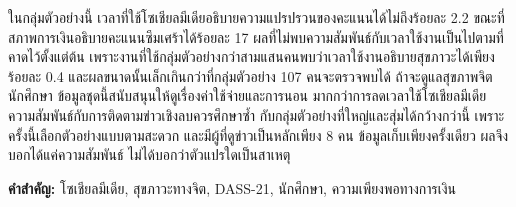 ในกลุ่มตัวอย่างนี้ เวลาที่ใช้โซเชียลมีเดียอธิบายความแปรปรวนของคะแนนได้ไม่ถึงร้อยละ 2.2
ขณะที่สภาพการเงินอธิบายคะแนนซึมเศร้าได้ร้อยละ 17
ผลที่ไม่พบความสัมพันธ์กับเวลาใช้งานเป็นไปตามที่คาดไว้ตั้งแต่ต้น
เพราะงานที่ใช้กลุ่มตัวอย่างกว่าสามแสนคนพบว่าเวลาใช้งานอธิบายสุขภาวะได้เพียงร้อยละ 0.4
และผลขนาดนั้นเล็กเกินกว่าที่กลุ่มตัวอย่าง 107 คนจะตรวจพบได้
ถ้าจะดูแลสุขภาพจิตนักศึกษา ข้อมูลชุดนี้สนับสนุนให้ดูเรื่องค่าใช้จ่ายและการนอน
มากกว่าการลดเวลาใช้โซเชียลมีเดีย ความสัมพันธ์กับการติดตามข่าวเชิงลบควรศึกษาซ้ำ
กับกลุ่มตัวอย่างที่ใหญ่และสุ่มได้กว้างกว่านี้ เพราะครั้งนี้เลือกตัวอย่างแบบตามสะดวก
และมีผู้ที่ดูข่าวเป็นหลักเพียง 8 คน
ข้อมูลเก็บเพียงครั้งเดียว ผลจึงบอกได้แค่ความสัมพันธ์ ไม่ได้บอกว่าตัวแปรใดเป็นสาเหตุ

\vspace{1em}

\noindent\textbf{คำสำคัญ:} โซเชียลมีเดีย, สุขภาวะทางจิต, DASS-21, นักศึกษา, ความเพียงพอทางการเงิน

\clearpage
